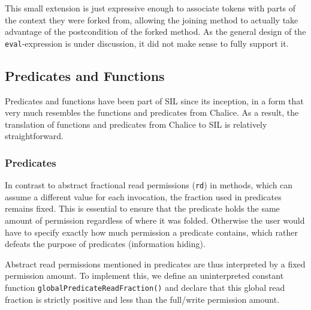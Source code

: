 This small extension is just expressive enough to associate tokens with parts of the context they were forked from, allowing the joining method to actually take advantage of the postcondition of the forked method. As the general design of the \lstinline[language=Chalice]!eval!-expression is under discussion, it did not make sense to fully support it.

\subsection{Predicates and Functions}\label{sct:pf}
Predicates and functions have been part of SIL since its inception, in a form that very much resembles the functions and predicates from Chalice. 
As a result, the translation of functions and predicates from Chalice to SIL is relatively straightforward. 

\subsubsection{Predicates}

In contrast to abstract fractional read permissions (\lstinline[language=Chalice]!rd!) in methods, which can assume a different value for each invocation, the fraction used in predicates remains fixed. 
This is essential to ensure that the predicate holds the same amount of permission regardless of where it was folded. 
Otherwise the user would have to specify exactly how much permission a predicate contains, which rather defeats the purpose of predicates (information hiding).

Abstract read permissions mentioned in predicates are thus interpreted by a fixed permission amount.
To implement this, we define an uninterpreted constant function \texttt{globalPredicateReadFraction()} and declare that this global read fraction is strictly positive and less than the full/write permission amount.

